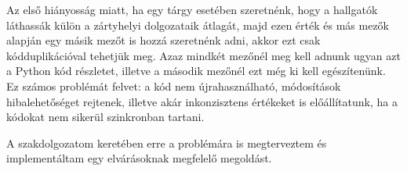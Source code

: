 Az első hiányosság miatt, ha egy tárgy esetében szeretnénk, hogy a hallgatók láthassák külön a zártyhelyi dolgozataik átlagát, majd ezen érték és más mezők alapján egy másik mezőt is hozzá szeretnénk adni, akkor ezt csak kódduplikációval tehetjük meg. Azaz mindkét mezőnél meg kell adnunk ugyan azt a Python kód részletet, illetve a második mezőnél ezt még ki kell egészítenünk. Ez számos problémát felvet: a kód nem újrahasználható, módosítások hibalehetőséget rejtenek, illetve akár inkonzisztens értékeket is előállítatunk, ha a kódokat nem sikerül szinkronban tartani.

A szakdolgozatom keretében erre a problémára is megterveztem és implementáltam egy elvárásoknak megfelelő megoldást. 
